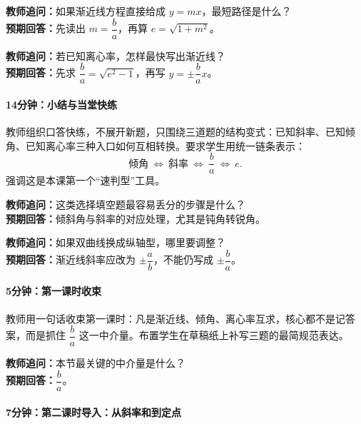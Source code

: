 \documentclass[UTF8,a4paper,11pt]{ctexart}
\begin{document}
\noindent\textbf{教师追问：}如果渐近线方程直接给成 $y=mx$，最短路径是什么？\\

\textbf{预期回答：}先读出 $m=\dfrac{b}{a}$，再算 $e=\sqrt{1+m^2}$。\par

\noindent\textbf{教师追问：}若已知离心率，怎样最快写出渐近线？\\

\textbf{预期回答：}先求 $\dfrac{b}{a}=\sqrt{e^2-1}$，再写 $y=\pm\dfrac{b}{a}x$。\par

\paragraph{14分钟：小结与当堂快练}

教师组织口答快练，不展开新题，只围绕三道题的结构变式：已知斜率、已知倾角、已知离心率三种入口如何互相转换。要求学生用统一链条表示：
\[
\text{倾角}\ \Longleftrightarrow\ \text{斜率}\ \Longleftrightarrow\ \frac{b}{a}\ \Longleftrightarrow\ e.
\]
强调这是本课第一个“速判型”工具。

\noindent\textbf{教师追问：}这类选择填空题最容易丢分的步骤是什么？\\

\textbf{预期回答：}倾斜角与斜率的对应处理，尤其是钝角转锐角。\par

\noindent\textbf{教师追问：}如果双曲线换成纵轴型，哪里要调整？\\

\textbf{预期回答：}渐近线斜率应改为 $\pm\dfrac{a}{b}$，不能仍写成 $\pm\dfrac{b}{a}$。\par

\paragraph{5分钟：第一课时收束}

教师用一句话收束第一课时：凡是渐近线、倾角、离心率互求，核心都不是记答案，而是抓住 $\dfrac{b}{a}$ 这一中介量。布置学生在草稿纸上补写三题的最简规范表达。

\noindent\textbf{教师追问：}本节最关键的中介量是什么？\\

\textbf{预期回答：}$\dfrac{b}{a}$。\par

\paragraph{7分钟：第二课时导入：从斜率和到定点}
\end{document}
